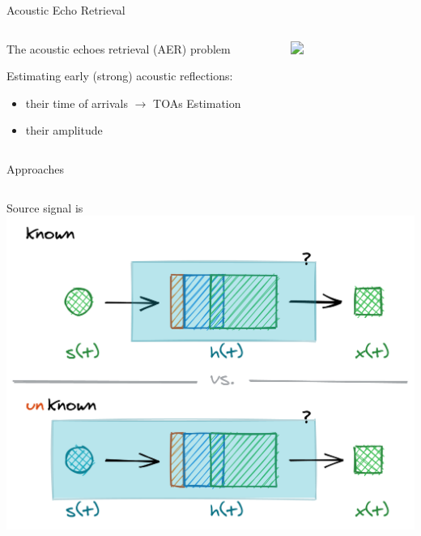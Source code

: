 \begin{frame}[t]{Acoustic Echo Retrieval}


    \begin{columns}[T,onlytextwidth]

        \begin{alertblock}{The acoustic echoes retrieval (AER) problem}

            \vspace{.1em}
            Estimating early (strong) acoustic reflections:
            \begin{itemize}
                \item their time of arrivals $\rightarrow$ TOAs Estimation
                \item their amplitude
            \end{itemize}
        \end{alertblock}

            \begin{figure}
                \centering
                \includegraphics<2->[width=\textwidth]{./figures/arrivals.png}
            \end{figure}

    \end{columns}

    \pause[3]
    \vfill
    Approaches
    \begin{columns}[T,onlytextwidth]
        \centering
        Source signal is
        \includegraphics[width=.9\textwidth]{./figures/active-passive.png}


\end{columns}
\end{frame}
